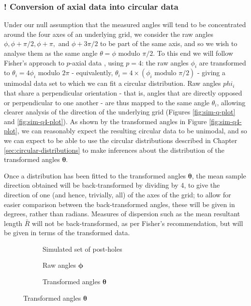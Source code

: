 \documentclass[../../ArchStats.tex]{subfiles}
\begin{document}
\subsubsection{! Conversion of axial data into circular data}
Under our null assumption that the measured angles will tend to be concentrated around the four axes of an underlying grid, we consider the raw angles $\phi, \phi + \pi/2, \phi + \pi,$ and $\phi + 3\pi/2$ to be part of the same axis, and so we wish to analyse them as the same angle $\theta = \phi \text{ modulo }\pi/2$.
To this end we will follow Fisher's approach to $p$-axial data \cite{Fisher1993}, using $p=4$: the raw angles $\phi_i$ are transformed to $\theta_i = 4\phi_i \text{ modulo } 2\pi$ - equivalently, $\theta_i = 4 \times (\phi_i \text{ modulo }\pi/2)$ - giving a unimodal data set to which we can fit a circular distribution. Raw angles $phi_i$ that share a perpendicular orientation - that is, angles that are directly opposed or perpendicular to one another - are thus mapped to the same angle $\theta_i$, allowing clearer analysis of the direction of the underlying grid (Figures \ref{fig:sim-q-plot} and \ref{fig:sim-q4-plot}). As shown by the transformed angles in Figure \ref{fig:sim-q4-plot}, we can reasonably expect the resulting circular data to be unimodal, and so we can expect to be able to use the circular distributions described in Chapter \ref{sec:circular-distributions} to make inferences about the distribution of the transformed angles $\mathbf{\theta}$.

Once a distribution has been fitted to the transformed angles $\mathbf{\theta}$, the mean sample direction obtained will be back-transformed by dividing by 4, to give the direction of one (and hence, trivially, all) of the axes of the grid; to allow for easier comparison between the back-transformed angles, these will be given in degrees, rather than radians. Measures of dispersion such as the mean resultant length $\bar{R}$ will not be back-transformed, as per Fisher's recommendation, but will be given in terms of the transformed data.

\begin{figure}[h!]
\centering
\caption{Simulated set of buildings with post-holes 1m apart, with Gaussian $N(0,0.1)$ perturbation, and associated angles }
\label{fig:sim1}
\begin{subfigure}[t]{0.38\textwidth}
\caption{Simulated set of post-holes}
\label{fig:sim-plot-1}
\end{subfigure}
\begin{subfigure}[t]{0.3\textwidth}
\caption{Raw angles $\mathbf{\phi}$}
\label{fig:sim-q-plot-1}
\end{subfigure}
\begin{subfigure}[t]{0.3\textwidth}
\caption{Transformed angles $\mathbf{\theta}$}
\label{fig:sim-q4-plot-1}
\end{subfigure}
\end{figure}
\end{document}
